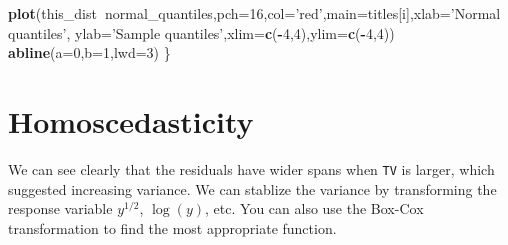 \documentclass[12pt,]{book}
\newenvironment{Shaded}{\begin{snugshade}}{\end{snugshade}}
\newcommand{\KeywordTok}[1]{\textcolor[rgb]{0.13,0.29,0.53}{\textbf{#1}}}
\newcommand{\DataTypeTok}[1]{\textcolor[rgb]{0.13,0.29,0.53}{#1}}
\newcommand{\DecValTok}[1]{\textcolor[rgb]{0.00,0.00,0.81}{#1}}
\newcommand{\StringTok}[1]{\textcolor[rgb]{0.31,0.60,0.02}{#1}}
\newcommand{\CommentTok}[1]{\textcolor[rgb]{0.56,0.35,0.01}{\textit{#1}}}
\newcommand{\OperatorTok}[1]{\textcolor[rgb]{0.81,0.36,0.00}{\textbf{#1}}}
\newcommand{\NormalTok}[1]{#1}
\begin{document}
\begin{Shaded}
\begin{Highlighting}[]
\KeywordTok{plot}\NormalTok{(this_dist}\OperatorTok{~}\NormalTok{normal_quantiles,}\DataTypeTok{pch=}\DecValTok{16}\NormalTok{,}\DataTypeTok{col=}\StringTok{'red'}\NormalTok{,}\DataTypeTok{main=}\NormalTok{titles[i],}\DataTypeTok{xlab=}\StringTok{'Normal quantiles'}\NormalTok{, }\DataTypeTok{ylab=}\StringTok{'Sample quantiles'}\NormalTok{,}\DataTypeTok{xlim=}\KeywordTok{c}\NormalTok{(}\OperatorTok{-}\DecValTok{4}\NormalTok{,}\DecValTok{4}\NormalTok{),}\DataTypeTok{ylim=}\KeywordTok{c}\NormalTok{(}\OperatorTok{-}\DecValTok{4}\NormalTok{,}\DecValTok{4}\NormalTok{))}
\KeywordTok{abline}\NormalTok{(}\DataTypeTok{a=}\DecValTok{0}\NormalTok{,}\DataTypeTok{b=}\DecValTok{1}\NormalTok{,}\DataTypeTok{lwd=}\DecValTok{3}\NormalTok{)}
\NormalTok{\}}
\end{Highlighting}
\end{Shaded}

\section{Homoscedasticity}\label{homoscedasticity}

We can see clearly that the residuals have wider spans when \texttt{TV}
is larger, which suggested increasing variance. We can stablize the
variance by transforming the response variable \(y^{1/2}\), \(\log(y)\),
etc. You can also use the Box-Cox transformation to find the most
appropriate function.

\begin{Shaded}
\end{Shaded}
\end{document}

